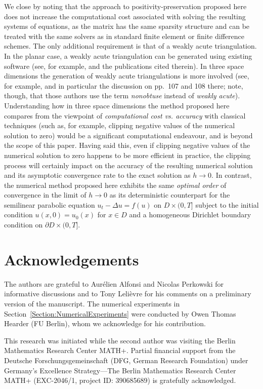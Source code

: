 \documentclass[12pt]{article}
\begin{document}
{We close by noting that the approach to positivity-preservation proposed here does not increase the computational cost associated with solving the resulting systems of equations, as the matrix has the same sparsity structure and can be treated with the same solvers as in standard finite element or finite difference schemes. The only additional requirement is that of a weakly acute triangulation. In the planar case, a weakly acute triangulation can be generated using existing software (see, for example, \cite{MR3765870} and the publications cited therein). In three space dimensions the generation of weakly acute triangulations is more involved (see, for example, \cite{MR4900691} and in particular the discussion on pp.~107 and 108 there; note, though, that those authors use the term \textit{nonobtuse} instead of \textit{weakly acute}). Understanding how
in three space dimensions the method proposed here compares from the viewpoint of \textit{computational cost vs. accuracy} with classical techniques (such as, for example, clipping negative values of the numerical solution to zero) would be a significant computational endeavour, and is beyond
the scope of this paper. Having said this, even if  clipping negative values of the numerical solution to zero happens to be more efficient in practice, the clipping process will certainly impact on the accuracy of the resulting numerical solution and its asymptotic convergence rate to the exact solution as $h \to 0$.  In contrast, the numerical method proposed here exhibits the same \textit{optimal order} of convergence in the limit of $h \to 0$ as its deterministic counterpart for the semilinear parabolic equation $u_t - \Delta u = f(u)$ on $D \times (0,T]$ subject to the initial condition $u(x,0)=u_0(x)$ for $x \in D$ and a homogeneous Dirichlet boundary condition on $\partial D \times (0,T]$.
}

%
%
\section*{Acknowledgements}
The authors are grateful to Aur{\'e}lien Alfonsi  and Nicolas Perkowski for informative discussions and to Tony Leli{\`e}vre for his comments on a preliminary version of the manuscript. The numerical experiments in Section~\ref{Section:NumericalExperiments} were conducted by Owen Thomas Hearder (FU Berlin), whom we acknowledge for his contribution.


This research was initiated while the second author was visiting the Berlin Mathematics Research Center MATH+. Partial financial support from the Deutsche Forschungsgemeinschaft (DFG, German Research Foundation) under Germany’s Excellence Strategy---The Berlin Mathematics Research Center MATH+
(EXC-2046/1, project ID: 390685689) is gratefully acknowledged.
\end{document}

